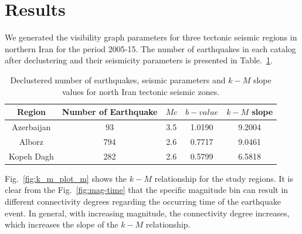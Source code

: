 \section{Results}
\noindent
We generated the visibility graph parameters for three tectonic seismic regions in northern Iran for the period 2005-15. The number of earthquakes in each catalog after declustering and their seismicity parameters is presented in Table.~\ref{tab:b_k_m_param}. 

\begin{table}[h]
\centering
\caption{Declustered number of earthquakes, seismic parameters and $k-M$ slope values for north Iran tectonic seismic zones.}
\begin{tabular}{ccccc}
Region          & Number of Earthquake &  $Mc$ &  $b-value$ & $k-M$ slope \\ \hline
Azerbaijan     & 93                                 & 3.5   & 1.0190  & 9.2004       \\ \hline
Alborz            & 794                               & 2.6   & 0.7717  & 9.0461      \\ \hline
Kopeh Dagh  & 282                               & 2.6   & 0.5799  & 6.5818     \\ \hline
\end{tabular}
\label{tab:b_k_m_param}
\end{table}

\noindent
Fig.~\ref{fig:k_m_plot_m}  shows the  $k-M$  relationship for the study regions. It is clear from the Fig.~\ref{fig:mag-time} that the specific magnitude bin can result in different connectivity degrees regarding the occurring time of the earthquake event. In general, with increasing magnitude, the connectivity degree increases, which increases the slope of the  $k-M$  relationship. 


